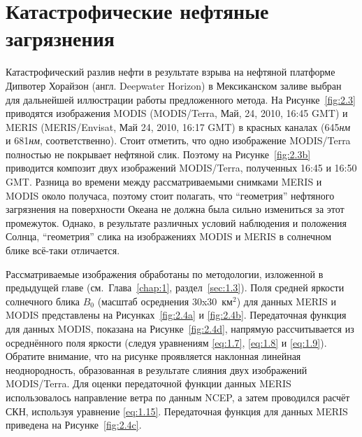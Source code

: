\section{Катастрофические нефтяные загрязнения}


Катастрофический разлив нефти в результате взрыва на нефтяной платформе Дипвотер Хорайзон (англ. Deepwater Horizon) в Мексиканском заливе выбран для дальнейшей иллюстрации работы предложенного метода. На Рисунке~\ref{fig:2.3} приводятся изображения MODIS (MODIS/Terra, Май, 24, 2010, 16:45 GMT) и MERIS (MERIS/Envisat, Май 24, 2010, 16:17 GMT) в красных каналах (645\textit{нм} и 681\textit{нм}, соответственно). Стоит отметить, что одно изображение MODIS/Terra полностью не покрывает нефтяной слик. Поэтому на Рисунке~\ref{fig:2.3b} приводится композит двух изображений MODIS/Terra, полученных 16:45 и 16:50 GMT. Разница во времени между рассматриваемыми снимками MERIS и MODIS около получаса, поэтому стоит полагать, что ``геометрия'' нефтяного загрязнения на поверхности Океана не должна была сильно измениться за этот промежуток. Однако, в результате различных условий наблюдения и положения Солнца, ``геометрия'' слика на изображениях MODIS и MERIS в солнечном блике всё-таки отличается.

Рассматриваемые изображения обработаны по методологии, изложенной в предыдущей главе (см.~Глава~\ref{chap:1}, раздел~\ref{sec:1.3}). Поля средней яркости солнечного блика $B_{0} $ (масштаб осреднения 30x30~км${}^{2}$) для данных MERIS и MODIS представлены на Рисунках~\ref{fig:2.4a} и \ref{fig:2.4b}. Передаточная функция для данных MODIS, показана на Рисунке~\ref{fig:2.4d}, напрямую рассчитывается из осреднённого поля яркости (следуя уравнениям \eqref{eq:1.7}, \eqref{eq:1.8} и \eqref{eq:1.9}). Обратите внимание, что на рисунке проявляется наклонная линейная неоднородность, образованная в результате слияния двух изображений MODIS/Terra. Для оценки передаточной функции данных MERIS использовалось направление ветра по данным NCEP, а затем проводился расчёт СКН, используя уравнение \eqref{eq:1.15}. Передаточная функция для данных MERIS приведена на Рисунке~\ref{fig:2.4c}.



